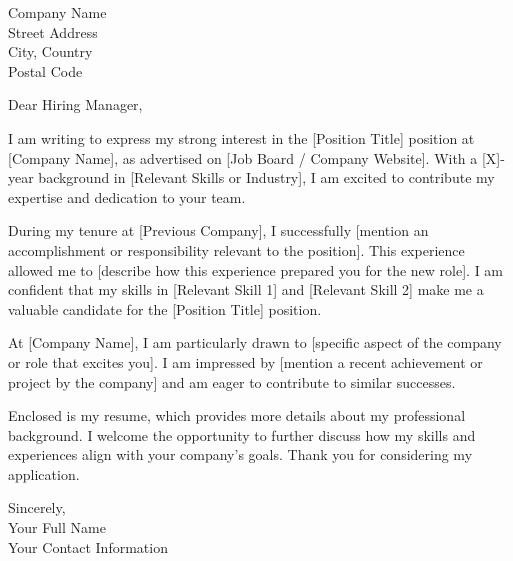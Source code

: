 \documentclass[a4paper,10pt]{letter}
\begin{document}
\begin{letter}{%
    Company Name \\
    Street Address \\
    City, Country \\
    Postal Code
}

\opening{Dear Hiring Manager,}

I am writing to express my strong interest in the [Position Title] position at [Company Name], as advertised on [Job Board / Company Website]. With a [X]-year background in [Relevant Skills or Industry], I am excited to contribute my expertise and dedication to your team.

During my tenure at [Previous Company], I successfully [mention an accomplishment or responsibility relevant to the position]. This experience allowed me to [describe how this experience prepared you for the new role]. I am confident that my skills in [Relevant Skill 1] and [Relevant Skill 2] make me a valuable candidate for the [Position Title] position.

At [Company Name], I am particularly drawn to [specific aspect of the company or role that excites you]. I am impressed by [mention a recent achievement or project by the company] and am eager to contribute to similar successes.

Enclosed is my resume, which provides more details about my professional background. I welcome the opportunity to further discuss how my skills and experiences align with your company's goals. Thank you for considering my application.

Sincerely, \\
Your Full Name \\
Your Contact Information

\end{letter}
\end{document}
